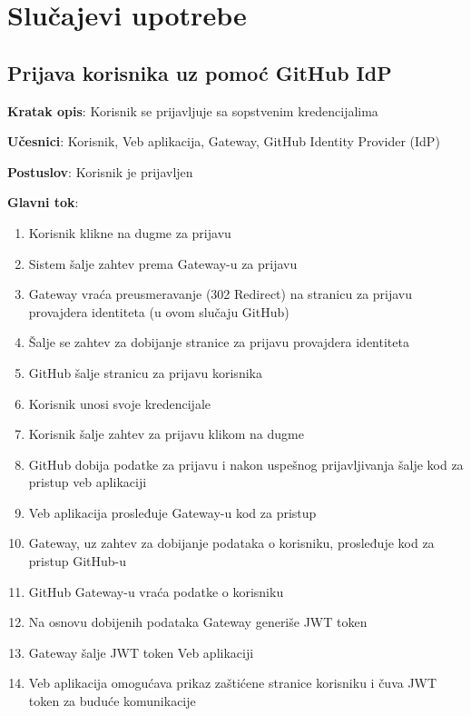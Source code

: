 \chapter{Slučajevi upotrebe}\label{ch:slucajevi_upotrebe}

\renewcommand{\labelenumii}{\arabic{enumi}.\arabic{enumii}}
\renewcommand{\labelenumiii}{\arabic{enumi}.\arabic{enumii}.\arabic{enumiii}}
\renewcommand{\labelenumiv}{\arabic{enumi}.\arabic{enumii}.\arabic{enumiii}.\arabic{enumiv}}

\section{Prijava korisnika uz pomoć GitHub IdP}

\textbf{Kratak opis}: Korisnik se prijavljuje sa sopstvenim kredencijalima

\textbf{Učesnici}: Korisnik, Veb aplikacija, Gateway, GitHub Identity Provider (IdP)

\textbf{Postuslov}: Korisnik je prijavljen

\textbf{Glavni tok}:
\begin{enumerate}
    \item Korisnik klikne na dugme za prijavu
    \item Sistem šalje zahtev prema Gateway-u za prijavu
    \item Gateway vraća preusmeravanje (302 Redirect) na stranicu za prijavu 
    provajdera identiteta (u ovom slučaju GitHub)
    \item Šalje se zahtev za dobijanje stranice za prijavu provajdera 
    identiteta
    \item GitHub šalje stranicu za prijavu korisnika
    \item Korisnik unosi svoje kredencijale
    \item Korisnik šalje zahtev za prijavu klikom na dugme
    \item GitHub dobija podatke za prijavu i nakon uspešnog prijavljivanja 
    šalje kod za pristup veb aplikaciji
    \item Veb aplikacija prosleđuje Gateway-u kod za pristup
    \item Gateway, uz zahtev za dobijanje podataka o korisniku, prosleđuje 
    kod za pristup GitHub-u 
    \item GitHub Gateway-u vraća podatke o korisniku
    \item Na osnovu dobijenih podataka Gateway generiše JWT token
    \item Gateway šalje JWT token Veb aplikaciji
    \item Veb aplikacija omogućava prikaz zaštićene stranice korisniku 
    i čuva JWT token za buduće komunikacije
\end{enumerate}

